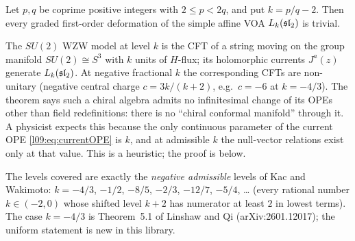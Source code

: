 \begin{theorem}
Let $p,q$ be coprime positive integers with $2 \le p < 2q$, and put $k = p/q - 2$. Then every
graded first-order deformation of the simple affine VOA $L_k(\mathfrak{sl}_2)$ is trivial.
\end{theorem}
\begin{physics}
The $SU(2)$ WZW model at level $k$ is the CFT of a string moving on the group manifold $SU(2)\cong S^3$
with $k$ units of $H$-flux; its holomorphic currents $J^a(z)$ generate $L_k(\mathfrak{sl}_2)$. At negative fractional
$k$ the corresponding CFTs are non-unitary (negative central charge $c = 3k/(k+2)$, e.g.\ $c=-6$ at $k=-4/3$).
The theorem says such a chiral algebra admits no infinitesimal change of its OPEs other than field
redefinitions: there is no ``chiral conformal manifold'' through it. A physicist expects this because the
only continuous parameter of the current OPE \eqref{l09:eq:currentOPE} is $k$, and at admissible $k$ the
null-vector relations exist only at that value. This is a heuristic; the proof is below.
\end{physics}


The levels covered are exactly the \emph{negative admissible} levels of Kac and Wakimoto:
$k = -4/3$, $-1/2$, $-8/5$, $-2/3$, $-12/7$, $-5/4$, \ldots{} (every rational number $k\in(-2,0)$
whose shifted level $k+2$ has numerator at least $2$ in lowest terms). The case $k=-4/3$ is
Theorem~5.1 of Linshaw and Qi (arXiv:2601.12017); the uniform statement is new in this library.

